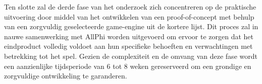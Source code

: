 Ten slotte zal de derde fase van het onderzoek zich concentreren op de praktische uitvoering door middel van het ontwikkelen van een proof-of-concept met behulp van een zorgvuldig geselecteerde game-engine uit de kortere lijst. Dit proces zal in nauwe samenwerking met AllPhi worden uitgevoerd om ervoor te zorgen dat het eindproduct volledig voldoet aan hun specifieke behoeften en verwachtingen met betrekking tot het spel. Gezien de complexiteit en de omvang van deze fase wordt een aanzienlijke tijdsperiode van 6 tot 8 weken gereserveerd om een grondige en zorgvuldige ontwikkeling te garanderen.

